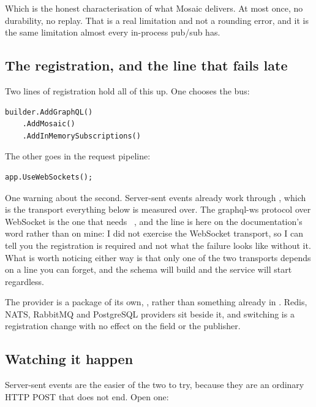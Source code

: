 %
Which is the honest characterisation of what Mosaic delivers. At most once, no
durability, no replay. That is a real limitation and not a rounding error, and
it is the same limitation almost every in-process pub/sub has.

\subsection*{The registration, and the line that fails late}

%
Two lines of registration hold all of this up. One chooses the bus:

\begin{verbatim}
builder.AddGraphQL()
    .AddMosaic()
    .AddInMemorySubscriptions()
\end{verbatim}

The other goes in the request pipeline:

\begin{verbatim}
app.UseWebSockets();
\end{verbatim}

One warning about the second. Server-sent events already work
through , which is the transport everything below is measured
over. The graphql-ws protocol over WebSocket is the one that needs
~\autocite{chillicream2026subscriptions}, and the line is
here on the documentation's word rather than on mine: I did not exercise the
WebSocket transport, so I can tell you the registration is required and not what
the failure looks like without it. What is worth noticing either way is that
only one of the two transports depends on a line you can forget, and the schema
will build and the service will start regardless.

The provider is a package of its own,
, rather than something already in
. Redis, NATS, RabbitMQ and PostgreSQL providers
sit beside it, and switching is a registration change with no effect on the
field or the publisher.

\subsection*{Watching it happen}

%
Server-sent events are the easier of the two to try, because they are an
ordinary HTTP POST that does not end. Open one:

